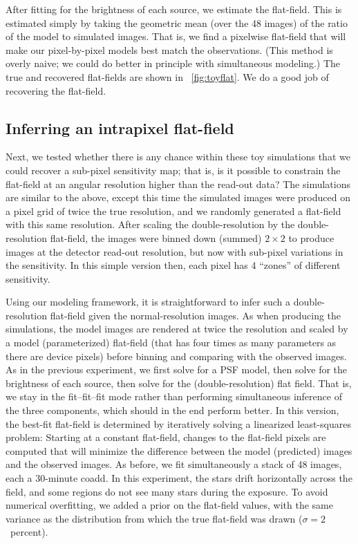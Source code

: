 \documentclass[letterpaper,12pt,whitepaper]{haastex}
\begin{document}
After fitting for the brightness of each source,
   we estimate the flat-field.
This is estimated simply by taking
  the geometric mean (over the 48 images) of the ratio of the model to simulated images.
That is, we find a pixelwise flat-field that will make our pixel-by-pixel
models best match the observations.
(This method is overly naive; we could do better in principle with simultaneous modeling.)
The true and recovered flat-fields are shown in \figurename~\ref{fig:toyflat}.
We do a good job of recovering the flat-field.

\subsection{Inferring an intrapixel flat-field}\label{sec:intrapixel}

Next, we tested whether there is any chance within these toy simulations
  that we could recover a sub-pixel sensitivity map;
  that is, is it possible to constrain the flat-field at an angular resolution
  higher than the read-out data?
The simulations are similar to the above,
  except this time the simulated images were produced on a pixel grid of twice the true resolution,
  and we randomly generated a flat-field with this same resolution.
After scaling the double-resolution by the double-resolution flat-field,
  the images were binned down (summed) $2\times 2$ to produce images at the detector read-out resolution,
  but now with sub-pixel variations in the sensitivity.
In this simple version then, each pixel has 4 ``zones'' of different sensitivity.

Using our modeling framework,
  it is straightforward to infer such a double-resolution flat-field
  given the normal-resolution images.
As when producing the simulations,
  the model images are rendered at twice the resolution and scaled by a model (parameterized) flat-field
  (that has four times as many parameters as there are device pixels)
  before binning and comparing with the observed images.
As in the previous experiment,
  we first solve for a PSF model,
  then solve for the brightness of each source,
  then solve for the (double-resolution) flat field.
That is, we stay in the fit--fit--fit mode rather than performing simultaneous inference
  of the three components, which should in the end perform better.
In this version, the best-fit flat-field is determined by iteratively solving a linearized least-squares problem:
Starting at a constant flat-field,
  changes to the flat-field pixels are computed that will minimize the difference
  between the model (predicted) images and the observed images.
As before, we fit simultaneously a stack of 48 images, each a 30-minute coadd.
In this experiment, the stars drift horizontally across the field,
  and some regions do not see many stars during the exposure.
To avoid numerical overfitting, we added a prior on the flat-field values,
  with the same variance as the distribution from which the true flat-field was drawn ($\sigma = 2$~percent).
\end{document}
